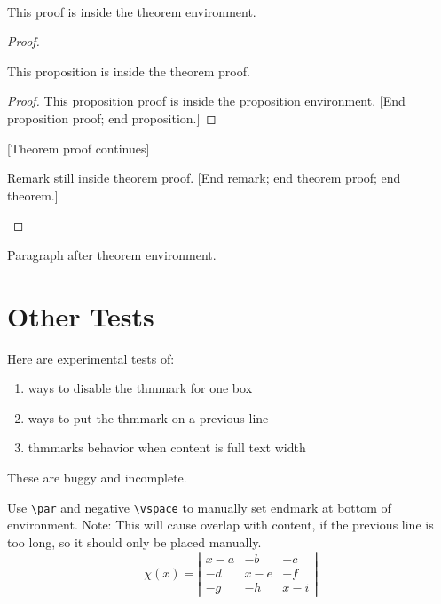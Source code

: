 \begin{theorem}
  \\
  This proof is inside the theorem environment.
  \begin{proof}
    \begin{proposition}
      This proposition is inside the theorem proof.
      \begin{proof}
        This proposition proof is inside the proposition environment.
        [End proposition proof; end proposition.]
      \end{proof}
    \end{proposition}
    [Theorem proof continues]
    \begin{remark}
      Remark still inside theorem proof.
      [End remark; end theorem proof; end theorem.]
    \end{remark}
  \end{proof}
\end{theorem}

Paragraph after theorem environment.

\clearpage
\section{Other Tests}

Here are experimental tests of:
\begin{enumerate}
\item ways to disable the thmmark for one box
\item ways to put the thmmark on a previous line
\item thmmarks behavior when content is full text width
\end{enumerate}
These are buggy and incomplete.

\newcommand{\noqed}{\renewcommand{\qedsymbol}{}}

\begin{test}
  Use \verb|\par| and negative \verb|\vspace| to manually set endmark at bottom of environment.
  Note: This will cause overlap with content, if the previous line is too long, so it should only be placed manually.
  \begin{equation*}
    \chi(x) =
    \left|              %
      \begin{array}{ccc}
        x-a  &-b  &-c  \\
        -d   &x-e &-f  \\
        -g   &-h  &x-i
      \end{array}
    \right|%
  \end{equation*}
  \par\vspace{-1.3\baselineskip}~
\end{test}

